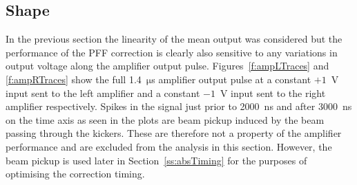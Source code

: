 \subsection{Shape}
\label{ss:ampShape}

In the previous section the linearity of the mean output was considered but the performance of the PFF correction is clearly also sensitive to any variations in output voltage along the amplifier output pulse. Figures~\ref{f:ampLTraces} and \ref{f:ampRTraces} show the full 1.4~\(\mathrm{\mu}\)s amplifier output pulse at a constant \(+1\)~V input sent to the left amplifier and a constant \(-1\)~V input sent to the right amplifier respectively. Spikes in the signal just prior to 2000~ns and after 3000~ns on the time axis as seen in the plots are beam pickup induced by the beam passing through the kickers. These are therefore not a property of the amplifier performance and are excluded from the analysis in this section. However, the beam pickup is used later in Section~\ref{ss:absTiming} for the purposes of optimising the correction timing.

